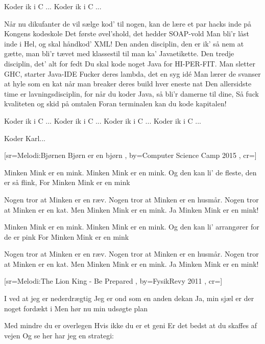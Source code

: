 \documentclass[pdftex,12pt]{article}
\begin{document}
\begin{songs}{}
\endverse
\beginverse
Koder ik i C ...
Koder ik i C ...

\endverse
\beginverse
Når nu dikufanter de vil sælge kod' til nogen,
kan de lære et par hacks inde på Kongens kodeskole
Det første øvel'shold, det hedder SOAP-vold
Man bli'r låst inde i Hel, og skal håndkod' XML!
Den anden disciplin, den er ik' så nem at gætte,
man bli'r tævet med klassestil til man ka' Javaetikette.
Den tredje disciplin, det' alt for fedt
Du skal kode noget Java for HI-PER-FIT.
Man sletter GHC, starter Java-IDE
Fucker deres lambda, det en syg idé
Man lærer de svanser at hyle som en kat
når man breaker deres build hver eneste nat
Den allersidste time er lavningsdisciplin,
for når du koder Java, så bli'r damerne til dine,
Så fuck kvaliteten og skid på omtalen
Foran terminalen kan du kode kapitalen!

\endverse
\beginverse
Koder ik i C ...
Koder ik i C ...
Koder ik i C ...
Koder ik i C ...

\endverse
\beginverse
Koder Karl...

\endverse
\endsong



[sr={Melodi:Bjørnen Bjørn er en bjørn}
,
by={Computer Science Camp 2015}
,
cr={}]\hypertarget{Minken Mink}{}
\label{song81}

\beginverse
Minken Mink er en mink.
Minken Mink er en mink.
Og den kan li' de fleste, den er så flink,
For Minken Mink er en mink

\endverse
\beginverse
Nogen tror at Minken er en ræv.
Nogen tror at Minken er en husmår.
Nogen tror at Minken er en kat.
Men Minken Mink er en mink.
Ja Minken Mink er en mink!

\endverse
\beginverse
Minken Mink er en mink.
Minken Mink er en mink.
Og den kan li' arrangører for de er pink
For Minken Mink er en mink

\endverse
\beginverse
Nogen tror at Minken er en ræv.
Nogen tror at Minken er en husmår.
Nogen tror at Minken er en kat.
Men Minken Mink er en mink.
Ja Minken Mink er en mink!

\endverse
\endsong



[sr={Melodi:The Lion King - Be Prepared}
,
by={FysikRevy 2011}
,
cr={}]\hypertarget{Drop Nu Ud}{}
\label{song82}

\beginverse
I ved at jeg er nederdrægtig
Jeg er ond som en anden dekan
Ja, min sjæl er der noget fordækt i
Men hør nu min udsøgte plan

\endverse
\beginverse
Med mindre du er overlegen
Hvis ikke du er et geni
Er det bedst at du skaffes af vejen
Og se her har jeg en strategi:


\end{songs}
\end{document}
